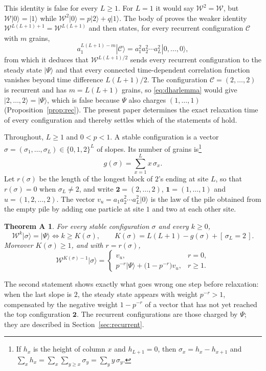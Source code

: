 \documentclass[11pt]{amsart}
\newtheorem*{theoremA}{Theorem A}
\theoremstyle{definition}
\theoremstyle{remark}
\newcommand{\cW}{\mathcal{W}}
\newcommand{\ket}[1]{|#1\rangle}
\newcommand{\two}{\mathbf{2}}
\newcommand{\one}{\mathbf{1}}
\newcommand{\Ind}[1]{[\,#1\,]}
\begin{document}
This identity is false for every $L\ge1$. For $L=1$ it would say $\cW^2=\cW$, but $\cW\ket{0}=\ket{1}$ while $\cW^2\ket{0}=p\ket{2}+q\ket{1}$. The body of \cite{Dha04} proves the weaker identity $\cW^{L(L+1)+1}=\cW^{L(L+1)}$ and then states, for every recurrent configuration $\mathcal C$ with $m$ grains,
\begin{equation}\label{eq:dharlemma}
a_1^{L(L+1)-m}\ket{\mathcal C}=a_1^2a_2^2\cdots a_L^2\ket{0,\dots,0},
\end{equation}
from which it deduces that $\cW^{L(L+1)/2}$ sends every recurrent configuration to the steady state $\ket{\Psi}$ and that every connected time-dependent correlation function vanishes beyond time difference $L(L+1)/2$. The configuration $\mathcal C=(2,\dots,2)$ is recurrent and has $m=L(L+1)$ grains, so \eqref{eq:dharlemma} would give $\ket{2,\dots,2}=\ket{\Psi}$, which is false because $\Psi$ also charges $(1,\dots,1)$ (Proposition~\ref{prop:rec}). The present paper determines the exact relaxation time of every configuration and thereby settles which of the statements of \cite{Dha04} hold.

Throughout, $L\ge1$ and $0<p<1$. A stable configuration is a vector $\sigma=(\sigma_1,\dots,\sigma_L)\in\{0,1,2\}^L$ of slopes. Its number of grains is\footnote{If $h_x$ is the height of column $x$ and $h_{L+1}=0$, then $\sigma_x=h_x-h_{x+1}$ and $\sum_x h_x=\sum_x\sum_{y\ge x}\sigma_y=\sum_y y\,\sigma_y$.}
\[
g(\sigma)=\sum_{x=1}^L x\,\sigma_x .
\]
Let $r(\sigma)$ be the length of the longest block of $2$'s ending at site $L$, so that $r(\sigma)=0$ when $\sigma_L\ne2$, and write $\two=(2,\dots,2)$, $\one=(1,\dots,1)$ and $u=(1,2,\dots,2)$. The vector $v_u=a_1a_2^2\cdots a_L^2\ket{0}$ is the law of the pile obtained from the empty pile by adding one particle at site $1$ and two at each other site.

\begin{theoremA}
For every stable configuration $\sigma$ and every $k\ge0$,
\[
\cW^k\ket{\sigma}=\ket{\Psi}\iff k\ge K(\sigma),\qquad K(\sigma)=L(L+1)-g(\sigma)+\Ind{\sigma_L=2}.
\]
Moreover $K(\sigma)\ge1$, and with $r=r(\sigma)$,
\[
\cW^{K(\sigma)-1}\ket{\sigma}=
\begin{cases}
v_u, & r=0,\\[2pt]
p^{-r}\ket{\Psi}+\bigl(1-p^{-r}\bigr)v_u, & r\ge1.
\end{cases}
\]
\end{theoremA}

The second statement shows exactly what goes wrong one step before relaxation: when the last slope is $2$, the steady state appears with weight $p^{-r}>1$, compensated by the negative weight $1-p^{-r}$ of a vector that has not yet reached the top configuration $\two$. The recurrent configurations are those charged by $\Psi$; they are described in Section~\ref{sec:recurrent}.
\end{document}
